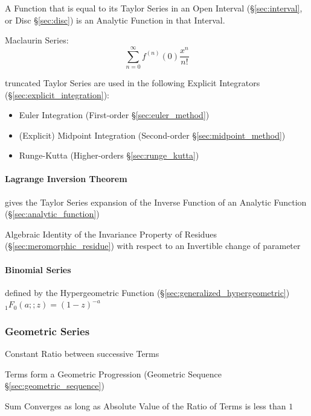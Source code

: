A Function that is equal to its Taylor Series in an Open Interval
(\S\ref{sec:interval}, or Disc \S\ref{sec:disc}) is an Analytic Function in
that Interval.

Maclaurin Series:
\[
  \sum_{n=0}^\infty f^{(n)}(0) \frac{x^n}{n!}
\]

truncated Taylor Series are used in the following Explicit Integrators
(\S\ref{sec:explicit_integration}):
\begin{itemize}
  \item Euler Integration (First-order \S\ref{sec:euler_method})
  \item (Explicit) Midpoint Integration (Second-order
    \S\ref{sec:midpoint_method})
  \item Runge-Kutta (Higher-orders \S\ref{sec:runge_kutta})
\end{itemize}



\paragraph{Lagrange Inversion Theorem}\label{sec:lagrange_inversion}\hfill

gives the Taylor Series expansion of the Inverse Function of an Analytic
Function (\S\ref{sec:analytic_function})

Algebraic Identity of the Invariance Property of Residues
(\S\ref{sec:meromorphic_residue}) with respect to an Invertible change of
parameter



\paragraph{Binomial Series}\label{sec:binomial_series}\hfill

defined by the Hypergeometric Function (\S\ref{sec:generalized_hypergeometric})
$_1F_0(a;;z) = (1 - z)^{-a}$



\subsubsection{Geometric Series}\label{sec:geometric_series}

Constant Ratio between successive Terms

Terms form a Geometric Progression (Geometric Sequence
\S\ref{sec:geometric_sequence})

Sum Converges as long as Absolute Value of the Ratio of Terms is less
than $1$

